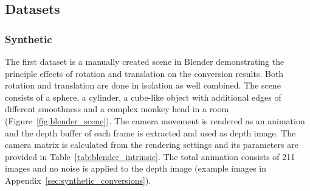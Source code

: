 \subsection{Datasets}

\subsubsection{Synthetic}\label{sec:dataset_synthetic}

The first dataset is a manually created scene in Blender\cite{blender} demonstrating the principle effects of rotation and translation on the conversion results.
Both rotation and translation are done in isolation as well combined.
The scene consists of a sphere, a cylinder, a cube-like object with additional edges of different smoothness and a complex monkey head in a room (Figure~\ref{fig:blender_scene}).
The camera movement is rendered as an animation and the depth buffer of each frame is extracted and used as depth image.
The camera matrix is calculated from the rendering settings and its parameters are provided in Table~\ref{tab:blender_intrinsic}.
The total animation consists of 211 images and no noise is applied to the depth image (example images in Appendix~\ref{sec:synthetic_conversions}).
